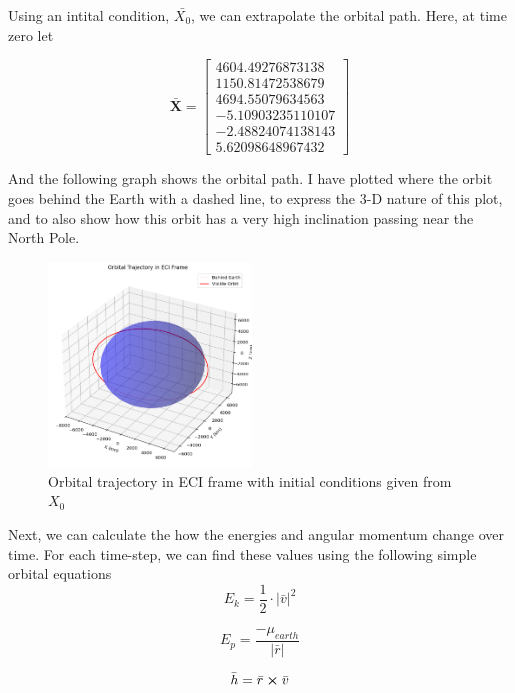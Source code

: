 \documentclass[12pt,twocolumn]{article}  %
\begin{document}
Using an intital condition, $\bar{X_0}$, we can extrapolate the orbital path. Here, at time zero let 

\begin{equation}
    \mathbf{\bar{X}} = 
    \begin{bmatrix}
        4604.49276873138 \\
        1150.81472538679 \\
        4694.55079634563 \\
        -5.10903235110107   \\
        -2.48824074138143 \\
        5.62098648967432
        \end{bmatrix}
\end{equation}

And the following graph shows the orbital path. I have plotted where the orbit goes behind the Earth with a dashed line,
to express the 3-D nature of this plot, and to also show how this orbit has a very high inclination passing near the North Pole.
\begin{figure}[H]
    \centering
    \includegraphics[width=0.48\textwidth]{Images/123-3d.png}
    \caption{Orbital trajectory in ECI frame with initial conditions given from $X_0$}
\end{figure}

Next, we can calculate the how the energies and angular momentum change over time. For each time-step, we can find these values using the following simple orbital equations
\setcounter{equation}{0}
\begin{equation}
E_{k} = \frac{1}{2} \cdot |\bar{v}|^{2}
\end{equation}

\begin{equation}
E_{p} = \frac{-\mu_{earth}}{|\bar{r}|}
\end{equation}

\begin{equation}
\bar{h} = \bar{r} \cross \bar{v}
\end{equation}
\end{document}
